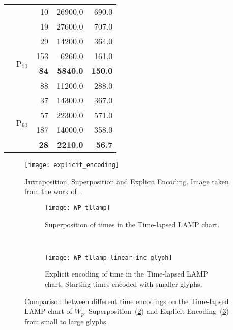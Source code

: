 \begin{table}[H]
\begin{tabular}{llrrr}
                            &                           & 10                & 26900.0          & 690.0          \\
                            &                           & 19                & 27600.0          & 707.0          \\ \cline{2-5} 
                            & \multirow{4}{*}{P$_{50}$} & 29                & 14200.0          & 364.0          \\
                            &                           & 153               & 6260.0          & 161.0          \\
                            &                           & \textbf{84}       & \textbf{5840.0} & \textbf{150.0} \\
                            &                           & 88                & 11200.0          & 288.0          \\ \cline{2-5} 
                            & \multirow{4}{*}{P$_{90}$} & 37                & 14300.0          & 367.0          \\
                            &                           & 57                & 22300.0          & 571.0          \\
                            &                           & 187               & 14000.0          & 358.0          \\
                            &                           & \textbf{28}       & \textbf{2210.0} & \textbf{56.7}  \\ \hline
  \end{tabular}
  \label{tab:cmg-results}
\end{table}

\begin{figure}[H]
  \centering
  \texttt{[image: explicit\_encoding]}
  \caption{Juxtaposition, Superposition and Explicit Encoding. Image taken from the work of~\cite{Szafir2018}.}
  \label{fig:explicit-endoding-szafir}
\end{figure}

\begin{figure}[H]
  \centering
  \begin{subfigure}[t]{0.75\textwidth}
    \centering
    \texttt{[image: WP-tllamp]}
    \caption{Superposition of times in the Time-lapsed LAMP chart.}
    \label{fig:superposition-tllamp-inc}
  \end{subfigure}
  ~
  \begin{subfigure}[t]{0.75\textwidth}
    \centering
    \texttt{[image: WP-tllamp-linear-inc-glyph]}
    \caption{Explicit encoding of time in the Time-lapsed LAMP chart. Starting times encoded with smaller glyphs.}
    \label{fig:ee-tllamp-inc}
  \end{subfigure}
  \caption{Comparison between different time encodings on the Time-lapsed LAMP chart of $W_p$. Superposition~(\ref{fig:superposition-tllamp-inc}) and Explicit Encoding~(\ref{fig:ee-tllamp-inc}) from small to large glyphs.}
  \label{fig:explicit-encoding-tllamp-inc}
\end{figure}

